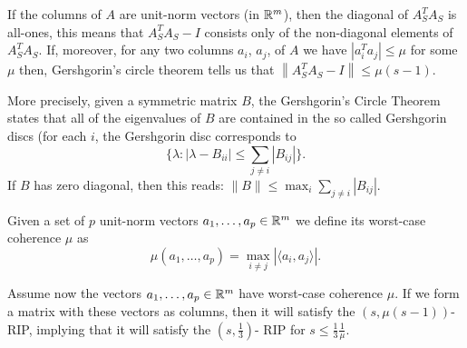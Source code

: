 If the columns of $A$ are unit-norm vectors (in $\mathbb{R}^m$), then the diagonal of $A_S^TA_S$ is all-ones, this means that $A_S^TA_S - I$ consists only of the non-diagonal elements of $A_S^TA_S$. If, moreover, for any two columns $a_i$, $a_j$, of $A$ we have $\left| a_i^Ta_j\right| \leq \mu$ for some $\mu$ then, Gershgorin's circle theorem tells us that $\left\| A_S^TA_S - I \right\| \leq \mu (s-1)$.

More precisely, given a symmetric matrix $B$, the Gershgorin's Circle Theorem~\cite{HJ90} states that all of the eigenvalues of $B$ are contained in the so called Gershgorin discs (for each $i$, the Gershgorin disc corresponds to 
$$\Big\{ \lambda : |\lambda - B_{ii}| \leq \sum_{j\neq i}\left|B_{ij}\right| \Big\}.$$ If $B$ has zero diagonal, then this reads: $\|B\| \leq \max_i \sum_{j\neq i} \left|B_{ij}\right|$.

Given a set of $p$ unit-norm vectors $a_1,\dots,a_p\in\mathbb{R}^m$ we define its worst-case coherence $\mu$ as
\begin{equation}\label{coherence}
\mu(a_1,\dots,a_p) = \max_{i\neq j} \left| \langle a_i, a_j \rangle  \right|.
\end{equation}

Assume now the vectors $a_1,\dots,a_p\in\mathbb{R}^m$ have worst-case coherence $\mu$. If we form a matrix with these vectors as columns, then it will satisfy the $\left( s , \mu(s-1) \right)$-RIP, implying that it will satisfy the $\left( s , \frac13 \right)$- RIP for $s  \leq \frac13\frac{1}\mu$.



